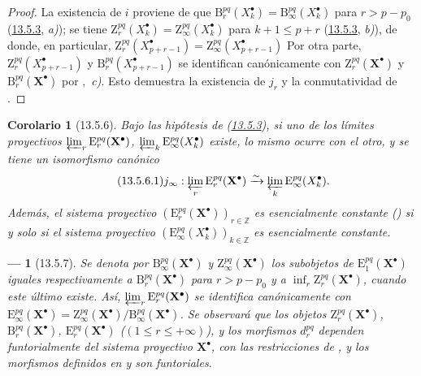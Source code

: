 \documentclass[10pt,oneside,openany]{book}
\theoremstyle{egaenv}\newtheorem*{env}{---}
\theoremstyle{egastatement}
\newtheorem*{corollary}{Corolario}
\theoremstyle{egadescription}
\newcommand{\oldpage}[2][]{\marginnote{\normalfont\scriptsize\textbf{#1}\,|\,#2}\ignorespaces}
\renewcommand{\leq}{\leqslant}
\begin{document}
\begin{proof}
La existencia de $i$ proviene de que $\mathrm B_r^{pq}(X_k^\bullet)=\mathrm B_\infty^{pq}(X_k^\bullet)$ para $r>p-p_0$ (\hyperref[0.13.5.3-fr]{13.5.3}, \emph{a)}); se tiene
$\mathrm Z_r^{pq}(X_k^\bullet)=\mathrm Z_\infty^{pq}(X_k^\bullet)$ para $k+1\leq p+r$ (\hyperref[0.13.5.3-fr]{13.5.3}, \emph{b)}), de donde, en particular,
$\mathrm Z_r^{pq}(X_{p+r-1}^\bullet)=
\mathrm Z_\infty^{pq}(X_{p+r-1}^\bullet)$
Por otra parte,
$\mathrm Z_r^{pq}(X_{p+r-1}^\bullet)$ y
$\mathrm B_r^{pq}(X_{p+r-1}^\bullet)$ se identifican canónicamente con
$\mathrm Z_r^{pq}(\mathbf X^\bullet)$ y
$\mathrm B_r^{pq}(\mathbf X^\bullet)$ por
,~\emph{c)}.
Esto demuestra la existencia de $j_r$ y la conmutatividad de
.
\end{proof}

\begin{corollary}[13.5.6]
\label{0.13.5.6-fr}
Bajo las hipótesis de \textup{(\hyperref[0.13.5.3-fr]{13.5.3})}, si uno de los límites proyectivos $\varprojlim_r\mathrm E_r^{pq}(\mathbf X^\bullet)$, $\varprojlim_k\mathrm E_\infty^{pq}(X_k^\bullet)$ existe, lo mismo ocurre con el otro, y se tiene un isomorfismo canónico
\begin{equation}
\label{0.13.5.6.1-fr}
\tag{13.5.6.1}
j_\infty:\varprojlim_r\mathrm E_r^{pq}(\mathbf X^\bullet)
\xrightarrow{\sim}
\varprojlim_k\mathrm E_\infty^{pq}(X_k^\bullet).
\end{equation}
Además, el sistema proyectivo
$(\mathrm E_r^{pq}(\mathbf X^\bullet))_{r\in\mathbb Z}$ es esencialmente
constante \textup{()} si y solo si el sistema proyectivo
$(\mathrm E_\infty^{pq}(X_k^\bullet))_{k\in\mathbb Z}$ es esencialmente
constante.
\end{corollary}

\begin{env}[13.5.7]
\label{0.13.5.7}
\label{0.13.5.7-fr}
Se denota por
$\mathrm B_\infty^{pq}(\mathbf X^\bullet)$ y
$\mathrm Z_\infty^{pq}(\mathbf X^\bullet)$ los subobjetos de
$\mathrm E_1^{pq}(\mathbf X^\bullet)$ iguales respectivamente a
$\mathrm B_r^{pq}(\mathbf X^\bullet)$ para $r>p-p_0$ y a
$\inf_r\mathrm Z_r^{pq}(\mathbf X^\bullet)$, cuando este último existe.
Así,
$\varprojlim_r\mathrm E_r^{pq}(\mathbf X^\bullet)$
\oldpage[0\textsubscript{III}]{73}
se identifica canónicamente con
$\mathrm E_\infty^{pq}(\mathbf X^\bullet)=
\mathrm Z_\infty^{pq}(\mathbf X^\bullet)/
\mathrm B_\infty^{pq}(\mathbf X^\bullet)$.
Se observará que los objetos
$\mathrm Z_r^{pq}(\mathbf X^\bullet)$,
$\mathrm B_r^{pq}(\mathbf X^\bullet)$,
$\mathrm E_r^{pq}(\mathbf X^\bullet)$
($(1\leq r\leq+\infty)$), y los morfismos $d_r^{pq}$ dependen
\emph{funtorialmente} del sistema proyectivo $\mathbf X^\bullet$, con las
restricciones de , y los morfismos definidos en
 y  son funtoriales.
\end{env}
\end{document}
